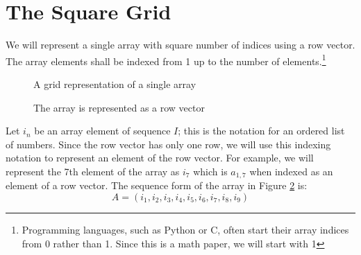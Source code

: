 \documentclass[letterpaper, twoside,12pt]{article}
\begin{document}
    \section{The Square Grid} \label{1_square_grid}
    We will represent a single array with square number of indices using a row vector. The array elements shall be indexed from 1 up to the number of elements.\footnote{Programming languages, such as Python or C, often start their array indices from 0 rather than 1. Since this is a math paper, we will start with 1}
    \begin{figure}[ht]
    \centering
    \caption{A grid representation of a single array} \label{1f1}
    \end{figure}

    \begin{figure}[ht]
        \centering
        \caption{The array is represented as a row vector} \label{row_vector_form}
    \end{figure}

    Let $i_n$ be an array element of sequence $I$; this is the notation for an ordered list of numbers. Since the row vector has only one row, we will use this indexing notation to represent an element of the row vector. For example, we will represent the 7th element of the array as $i_7$ which is $a_{1,7}$ when indexed as an element of a row vector. The sequence form of the array in Figure \ref{row_vector_form} is:
    \begin{equation}
        A = (i_1,i_2,i_3,i_4,i_5,i_6,i_7,i_8,i_9)
    \end{equation}
\end{document}
